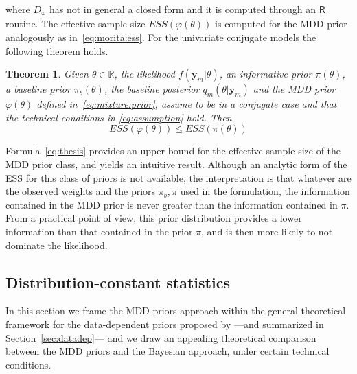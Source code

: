 \documentclass{statsoc}
\newtheorem{thm}{Theorem}
\begin{document}
where $ D_{\varphi}$ has not in general a closed form and it is computed through an $\mathsf{R}$ routine. The effective sample size $ESS(\varphi(\theta))$ is computed for the MDD prior analogously as in~\eqref{eq:morita:ess}. For the univariate conjugate models the following theorem holds.

\begin{thm}
 Given $\theta \in \mathbb{R}$, the likelihood $f(\bm{y}_{m}|\theta)$, an informative prior $\pi(\theta)$, a baseline prior $\pi_{b}(\theta)$, the baseline posterior $q_{m}(\theta|\bm{y}_{m})$ and the MDD prior $\varphi(\theta)$ defined in~\eqref{eq:mixture:prior}, assume to be in a conjugate case and that the technical conditions in \eqref{eq:assumption}
  hold.
Then
\begin{equation}
ESS(\varphi(\theta)) \le ESS(\pi(\theta))
\label{eq:thesis}
\end{equation}
\label{eq:thm_2}
\end{thm}

Formula~\eqref{eq:thesis} provides an upper bound for the effective sample size of the MDD prior class, and yields an intuitive result. Although an analytic form of the ESS for this class of priors is not available, the interpretation is that whatever are the observed weights and the priors $\pi_{b}, \pi$ used in the formulation, the information contained in the MDD prior is never greater than the information contained in $\pi$. From a practical point of view, this prior distribution provides a lower information than that contained in the prior $\pi$, and is then more likely to not dominate the likelihood.


\subsection{Distribution-constant statistics}

In this section we frame the MDD priors approach within the general theoretical framework for the data-dependent priors proposed by \cite{darnieder2011bayesian} ---and summarized in Section~\ref{sec:datadep}--- and we draw an appealing theoretical comparison between the MDD priors and the Bayesian approach, under certain technical conditions.
\end{document}
